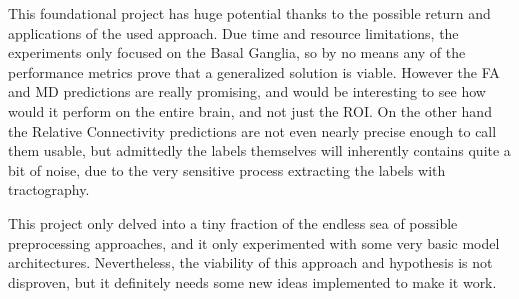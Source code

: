 \label{sec:conclusions}

This foundational project has huge potential thanks to the possible return and applications of the used approach. Due time and resource limitations, the experiments only focused on the Basal Ganglia, so by no means any of the performance metrics prove that a generalized solution is viable. However the \ac{FA} and \ac{MD} predictions are really promising, and would be interesting to see how would it perform on the entire brain, and not just the \ac{ROI}. On the other hand the Relative Connectivity predictions are not even nearly precise enough to call them usable, but admittedly the labels themselves will inherently contains quite a bit of noise, due to the very sensitive process extracting the labels with tractography.\par
This project only delved into a tiny fraction of the endless sea of possible preprocessing approaches, and it only experimented with some very basic model architectures. Nevertheless, the viability of this approach and hypothesis is not disproven, but it definitely needs some new ideas implemented to make it work.\par

